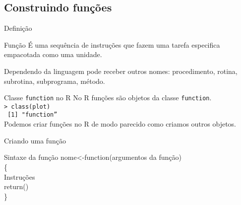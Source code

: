 \documentclass[handout]{beamer}
\begin{document}
\subsection{Construindo funções}
\begin{frame}{Definição}

  \begin{block}{Função}
É uma sequência de instruções que fazem uma tarefa especifica  empacotada como uma unidade.
 \end{block} \pause
 Dependendo da linguagem pode receber outros  nomes: procedimento, rotina, subrotina, subprograma, método. 

\end{frame}

\begin{frame}{Classe \texttt{function} no R}
No R funções são objetos da classe \texttt{function}.\\
\texttt{> class(plot)\\
~[1] "function''}
  \pause \\ \vspace{20pt}
Podemos criar funções no R de modo parecido como criamos outros objetos.
\end{frame}

\begin{frame}{Criando uma função}
  \begin{block}{Sintaxe da função}
   nome<-function(argumentos da função)\\
\hspace{50pt}\{\\
  \hspace{50pt}   Instruções \\
  \hspace{50pt} return()
\\ \hspace{50pt}\}
    
  \end{block}
\end{frame}
\end{document}
